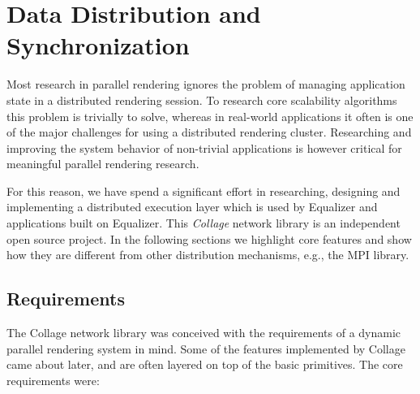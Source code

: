 \chapter{Data Distribution and Synchronization}\label{sCollage}

Most research in parallel rendering ignores the problem of managing application
state in a distributed rendering session. To research core scalability
algorithms this problem is trivially to solve, whereas in real-world
applications it often is one of the major challenges for using a distributed
rendering cluster. Researching and improving the system behavior of non-trivial
applications is however critical for meaningful parallel rendering research.

For this reason, we have spend a significant effort in researching, designing
and implementing a distributed execution layer which is used by Equalizer and
applications built on Equalizer. This {\em Collage} network library is an
independent open source project. In the following sections we highlight core
features and show how they are different from other distribution mechanisms,
e.g., the MPI library.

\section{Requirements}

The Collage network library was conceived with the requirements of a dynamic
parallel rendering system in mind. Some of the features implemented by Collage
came about later, and are often layered on top of the basic primitives. The core
requirements were:

